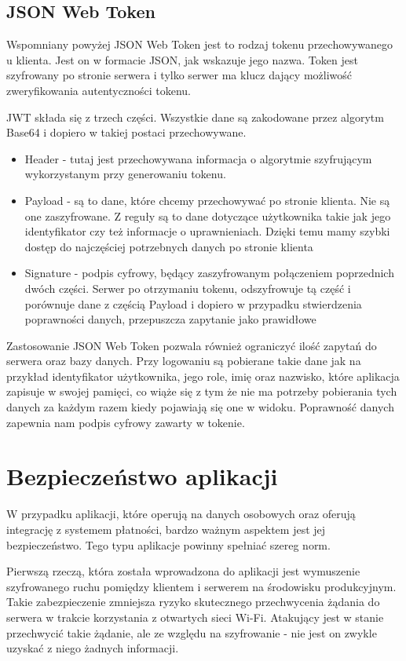 \subsection*{JSON Web Token}
Wspomniany powyżej JSON Web Token jest to rodzaj tokenu przechowywanego u klienta. Jest on w formacie JSON, jak wskazuje jego nazwa. Token jest szyfrowany po stronie serwera i tylko serwer ma klucz dający możliwość zweryfikowania autentyczności tokenu.

JWT składa się z trzech części. Wszystkie dane są zakodowane przez algorytm Base64 i dopiero w takiej postaci przechowywane.
\begin{itemize}
\item Header - tutaj jest przechowywana informacja o algorytmie szyfrującym wykorzystanym przy generowaniu tokenu.
\item Payload - są to dane, które chcemy przechowywać po stronie klienta. Nie są one zaszyfrowane. Z reguły są to dane dotyczące użytkownika takie jak jego identyfikator czy też informacje o uprawnieniach. Dzięki temu mamy szybki dostęp do najczęściej potrzebnych danych po stronie klienta
\item Signature - podpis cyfrowy, będący zaszyfrowanym połączeniem poprzednich dwóch części. Serwer po otrzymaniu tokenu, odszyfrowuje tą część i porównuje dane z częścią Payload i dopiero w przypadku stwierdzenia poprawności danych, przepuszcza zapytanie jako prawidłowe
\end{itemize}

Zastosowanie JSON Web Token pozwala również ograniczyć ilość zapytań do serwera oraz bazy danych. Przy logowaniu są pobierane takie dane jak na przykład identyfikator użytkownika, jego role, imię oraz nazwisko, które aplikacja zapisuje w swojej pamięci, co wiąże się z tym że nie ma potrzeby pobierania tych danych za każdym razem kiedy pojawiają się one w widoku. Poprawność danych zapewnia nam podpis cyfrowy zawarty w tokenie.

\newpage
\section{Bezpieczeństwo aplikacji}
W przypadku aplikacji, które operują na danych osobowych oraz oferują integrację z systemem płatności, bardzo ważnym aspektem jest jej bezpieczeństwo. Tego typu aplikacje powinny spełniać szereg norm.

Pierwszą rzeczą, która została wprowadzona do aplikacji jest wymuszenie szyfrowanego ruchu pomiędzy klientem i serwerem na środowisku produkcyjnym. Takie zabezpieczenie zmniejsza ryzyko skutecznego przechwycenia żądania do serwera w trakcie korzystania z otwartych sieci Wi-Fi. Atakujący jest w stanie przechwycić takie żądanie, ale ze względu na szyfrowanie - nie jest on zwykle uzyskać z niego żadnych informacji.

